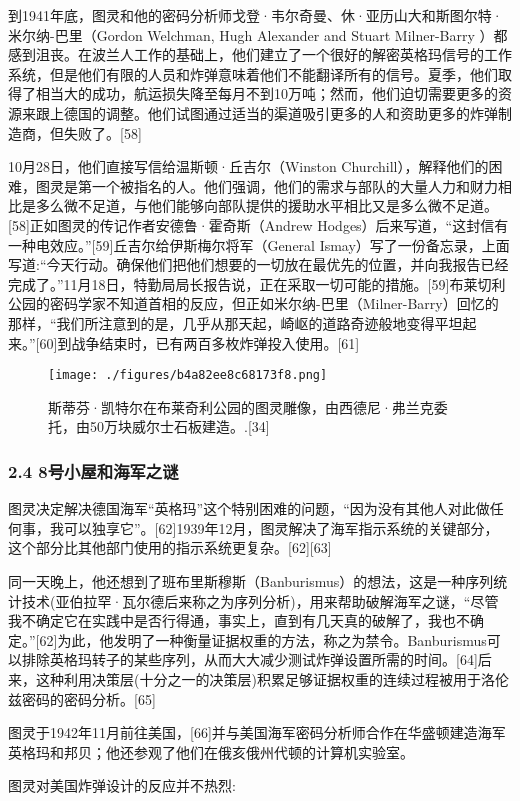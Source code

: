 到1941年底，图灵和他的密码分析师戈登·韦尔奇曼、休·亚历山大和斯图尔特·米尔纳-巴里（Gordon Welchman, Hugh Alexander and Stuart Milner-Barry ）都感到沮丧。在波兰人工作的基础上，他们建立了一个很好的解密英格玛信号的工作系统，但是他们有限的人员和炸弹意味着他们不能翻译所有的信号。夏季，他们取得了相当大的成功，航运损失降至每月不到10万吨；然而，他们迫切需要更多的资源来跟上德国的调整。他们试图通过适当的渠道吸引更多的人和资助更多的炸弹制造商，但失败了。[58]

10月28日，他们直接写信给温斯顿·丘吉尔（Winston Churchill），解释他们的困难，图灵是第一个被指名的人。他们强调，他们的需求与部队的大量人力和财力相比是多么微不足道，与他们能够向部队提供的援助水平相比又是多么微不足道。[58]正如图灵的传记作者安德鲁·霍奇斯（Andrew Hodges）后来写道，“这封信有一种电效应。”[59]丘吉尔给伊斯梅尔将军（General Ismay）写了一份备忘录，上面写道:“今天行动。确保他们把他们想要的一切放在最优先的位置，并向我报告已经完成了。”11月18日，特勤局局长报告说，正在采取一切可能的措施。[59]布莱切利公园的密码学家不知道首相的反应，但正如米尔纳-巴里（Milner-Barry）回忆的那样，“我们所注意到的是，几乎从那天起，崎岖的道路奇迹般地变得平坦起来。”[60]到战争结束时，已有两百多枚炸弹投入使用。[61]
\begin{figure}[ht]
\centering
\texttt{[image: ./figures/b4a82ee8c68173f8.png]}
\caption{斯蒂芬·凯特尔在布莱奇利公园的图灵雕像，由西德尼·弗兰克委托，由50万块威尔士石板建造。.[34]} \label{fig_ALTL_4}
\end{figure}
\subsubsection{2.4 8号小屋和海军之谜}
图灵决定解决德国海军“英格玛”这个特别困难的问题，“因为没有其他人对此做任何事，我可以独享它”。[62]1939年12月，图灵解决了海军指示系统的关键部分，这个部分比其他部门使用的指示系统更复杂。[62][63]

同一天晚上，他还想到了班布里斯穆斯（Banburismus）的想法，这是一种序列统计技术(亚伯拉罕·瓦尔德后来称之为序列分析)，用来帮助破解海军之谜，“尽管我不确定它在实践中是否行得通，事实上，直到有几天真的破解了，我也不确定。”[62]为此，他发明了一种衡量证据权重的方法，称之为禁令。Banburismus可以排除英格玛转子的某些序列，从而大大减少测试炸弹设置所需的时间。[64]后来，这种利用决策层(十分之一的决策层)积累足够证据权重的连续过程被用于洛伦兹密码的密码分析。[65]

图灵于1942年11月前往美国，[66]并与美国海军密码分析师合作在华盛顿建造海军英格玛和邦贝；他还参观了他们在俄亥俄州代顿的计算机实验室。

图灵对美国炸弹设计的反应并不热烈:

